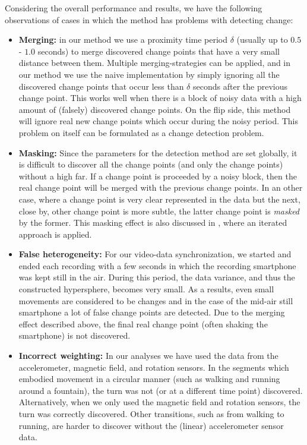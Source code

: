 Considering the overall performance and results, we have the following observations of cases in which the method has problems with detecting change:
\begin{itemize}
  \item \textbf{Merging:} in our method we use a proximity time period $\delta$ (usually up to $0.5$ - $1.0$ seconds) to merge discovered change points that have a very small distance between them.
  Multiple merging-strategies can be applied, and in our method we use the naive implementation by simply ignoring all the discovered change points that occur less than $\delta$ seconds after the previous change point.
  This works well when there is a block of noisy data with a high amount of (falsely) discovered change points.
  On the flip side, this method will ignore real new change points which occur during the noisy period.
  This problem on itself can be formulated as a change detection problem.
  \item \textbf{Masking:} Since the parameters for the detection method are set globally, it is difficult to discover all the change points (and only the change points) without a high \gls{far}.
  If a change point is proceeded by a noisy block, then the real change point will be merged with the previous change points.
  In an other case, where a change point is very clear represented in the data but the next, close by, other change point is more subtle, the latter change point is \emph{masked} by the former.
  This masking effect is also discussed in \cite{inclan1994use}, where an iterated approach is applied.
  \item \textbf{False heterogeneity:} For our video-data synchronization, we started and ended each recording with a few seconds in which the recording smartphone was kept still in the air.
  During this period, the data variance, and thus the constructed hypersphere, becomes very small.
  As a results, even small movements are considered to be changes and in the case of the mid-air still smartphone a lot of false change points are detected.
  Due to the merging effect described above, the final real change point (often shaking the smartphone) is not discovered.
  \item \textbf{Incorrect weighting:} In our analyses we have used the data from the accelerometer, magnetic field, and rotation sensors.
  In the segments which embodied movement in a circular manner (such as walking and running around a fountain), the turn was not (or at a different time point) discovered.
  Alternatively, when we only used the magnetic field and rotation sensors, the turn was correctly discovered.
  Other transitions, such as from walking to running, are harder to discover without the (linear) accelerometer sensor data.
\end{itemize}

